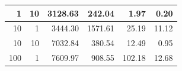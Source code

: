 \documentclass[12pt,a4paper,twoside,openright]{report}
\begin{document}
\begin{table}[H]
\begin{tabular}{|r|r|r|r|r|r|}
1                                                                                                & 10                                                                                                                         & 3128.63                                                                                                                                         & 242.04                                                                                                                           & 1.97                                                                                                     & 0.20                                                                                                                             \\ \hline
10                                                                                               & 1                                                                                                                          & 3444.30                                                                                                                                         & 1571.61                                                                                                                         & 25.19                                                                                                    & 11.12                                                                                                                            \\ \hline
10                                                                                               & 10                                                                                                                         & 7032.84                                                                                                                                         & 380.54                                                                                                                           & 12.49                                                                                                    & 0.95                                                                                                                             \\ \hline
100                                                                                              & 1                                                                                                                          & 7609.97                                                                                                                                         & 908.55                                                                                                                           & 102.18                                                                                                   & 12.68                                                                                                                            \\ \hline

\end{tabular}
\end{table}
\end{document}
